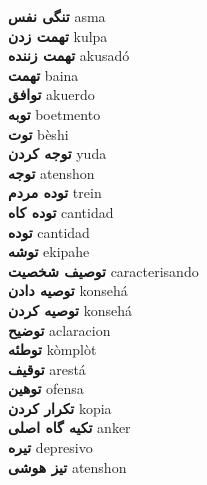 \textbf{ تنگی نفس  } asma \\
\textbf{ تهمت زدن  } kulpa \\
\textbf{ تهمت زننده  } akusadó \\
\textbf{ تهمت  } baina \\
\textbf{ توافق  } akuerdo \\
\textbf{ توبه  } boetmento \\
\textbf{ توت  } bèshi \\
\textbf{ توجه کردن  } yuda \\
\textbf{ توجه  } atenshon \\
\textbf{ توده مردم  } trein \\
\textbf{ توده کاه  } cantidad \\
\textbf{ توده  } cantidad \\
\textbf{ توشه  } ekipahe \\
\textbf{ توصیف شخصیت  } caracterisando \\
\textbf{ توصیه دادن  } konsehá \\
\textbf{ توصیه کردن  } konsehá \\
\textbf{ توضیح  } aclaracion \\
\textbf{ توطئه  } kòmplòt \\
\textbf{ توقیف  } arestá \\
\textbf{ توهین  } ofensa \\
\textbf{ تکرار کردن  } kopia \\
\textbf{ تکیه گاه اصلی  } anker \\
\textbf{ تیره  } depresivo \\
\textbf{ تیز هوشی  } atenshon \\
